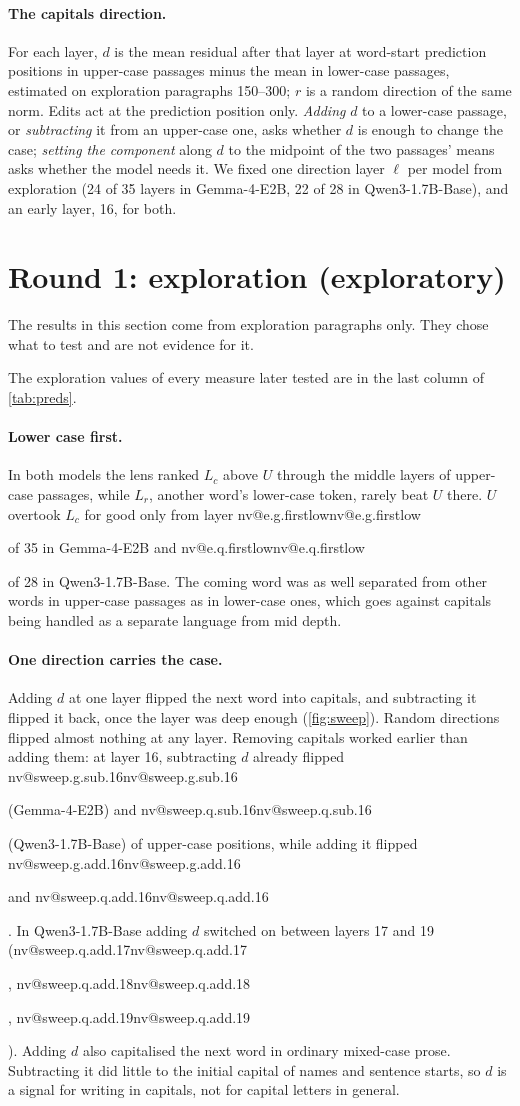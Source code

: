 \documentclass[11pt]{article}
\makeatletter
\newcommand{\nv}[1]{\ifcsname nv@#1\endcsname\csname nv@#1\endcsname\else\PackageError{numbers}{Unknown number key #1}{}\fi}
\newcommand{\gm}{Gemma-4-E2B}
\newcommand{\qw}{Qwen3-1.7B-Base}
\newcommand{\Uc}{\ensuremath{U}}
\newcommand{\Lc}{\ensuremath{L_c}}
\newcommand{\Lr}{\ensuremath{L_r}}
\makeatother
\begin{document}
\paragraph{The capitals direction.} For each layer, $d$ is the mean residual after that layer at word-start prediction positions in upper-case passages minus the mean in lower-case passages, estimated on exploration paragraphs 150--300; $r$ is a random direction of the same norm. Edits act at the prediction position only. \emph{Adding} $d$ to a lower-case passage, or \emph{subtracting} it from an upper-case one, asks whether $d$ is enough to change the case; \emph{setting the component} along $d$ to the midpoint of the two passages' means asks whether the model needs it. We fixed one direction layer $\ell$ per model from exploration (24 of 35 layers in \gm{}, 22 of 28 in \qw{}), and an early layer, 16, for both.


\section{Round 1: exploration (exploratory)}
\label{sec:explore}

The results in this section come from exploration paragraphs only. They chose what to test and are not evidence for it.

The exploration values of every measure later tested are in the last column of \cref{tab:preds}.

\paragraph{Lower case first.} In both models the lens ranked \Lc{} above \Uc{} through the middle layers of upper-case passages, while \Lr{}, another word's lower-case token, rarely beat \Uc{} there. \Uc{} overtook \Lc{} for good only from layer \nv{e.g.firstlow} of 35 in \gm{} and \nv{e.q.firstlow} of 28 in \qw{}. The coming word was as well separated from other words in upper-case passages as in lower-case ones, which goes against capitals being handled as a separate language from mid depth.

\paragraph{One direction carries the case.} Adding $d$ at one layer flipped the next word into capitals, and subtracting it flipped it back, once the layer was deep enough (\cref{fig:sweep}). Random directions flipped almost nothing at any layer. Removing capitals worked earlier than adding them: at layer 16, subtracting $d$ already flipped \nv{sweep.g.sub.16} (\gm{}) and \nv{sweep.q.sub.16} (\qw{}) of upper-case positions, while adding it flipped \nv{sweep.g.add.16} and \nv{sweep.q.add.16}. In \qw{} adding $d$ switched on between layers 17 and 19 (\nv{sweep.q.add.17}, \nv{sweep.q.add.18}, \nv{sweep.q.add.19}). Adding $d$ also capitalised the next word in ordinary mixed-case prose. Subtracting it did little to the initial capital of names and sentence starts, so $d$ is a signal for writing in capitals, not for capital letters in general.
\end{document}
